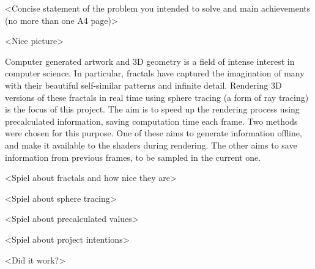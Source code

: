<Concise statement of the problem you intended to solve and main achievements (no more than one A4 page)>

<Nice picture>

Computer generated artwork and 3D geometry is a field of intense interest in computer science. In particular, fractals have captured the imagination of many with their beautiful self-similar patterns and infinite detail. Rendering 3D versions of these fractals in real time using sphere tracing (a form of ray tracing) is the focus of this project. The aim is to speed up the rendering process using precalculated information, saving computation time each frame. Two methods were chosen for this purpose. One of these aims to generate information offline, and make it available to the shaders during rendering. The other aims to save information from previous frames, to be sampled in the current one.

<Spiel about fractals and how nice they are>

<Spiel about sphere tracing>

<Spiel about precalculated values>

<Spiel about project intentions>

<Did it work?>
